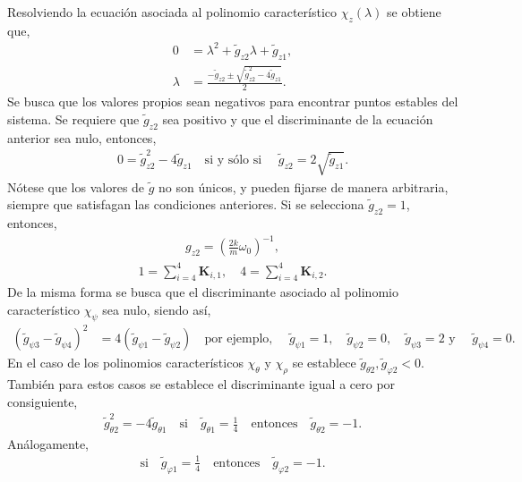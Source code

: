 Resolviendo la ecuación asociada al polinomio característico $\chi_{z}(\lambda)$ se obtiene que, 
\begin{align}
0 & = \lambda^2 + \tilde{g}_{z 2} \lambda + \tilde{g}_{z 1}, \\
\lambda &= \frac{- \tilde{g}_{z 2} \pm \sqrt{\tilde{g}_{z 2}^2 - 4\tilde{g}_{z 1} }}{2}.
\end{align}
Se busca que los valores propios sean negativos para encontrar puntos estables del sistema. Se requiere que $\tilde{g}_{z2}$ sea positivo y que el discriminante de la ecuación anterior sea nulo, entonces,  \begin{align}
    0 = \tilde{g}_{z 2}^2 - 4\tilde{g}_{z 1} \quad\text{si y sólo si }\quad \tilde{g}_{z 2} = 2\sqrt{\tilde{g}_{z1}}.
\end{align}
Nótese que los valores de $\tilde{g}$ no son únicos, y pueden fijarse de manera arbitraria, siempre que satisfagan las condiciones anteriores. Si se selecciona $\tilde{g}_{z2} = 1$, entonces, 
\begin{align}
    g_{z2} = \left( \frac{2k}{m}\omega_0\right)^{-1},
\end{align}
\begin{align}
    1 = \sum_{i=4}^{4}\mathbf{K}_{i, 1}, \quad 4= \sum_{i=4}^{4}\mathbf{K}_{i, 2}.
\end{align}
De la misma forma se busca que el discriminante asociado al polinomio característico  $\chi_{\psi}$ sea nulo, siendo así, 
\begin{align}
    (\tilde{g}_{\psi 3} - \tilde{g}_{\psi4})^2 &= 4(\tilde{g}_{\psi 1} - \tilde{g}_{\psi 2}) \quad\text{por ejemplo, }\quad \tilde{g}_{\psi 1} = 1, \quad\tilde{g}_{\psi 2} = 0, \quad\tilde{g}_{\psi 3}=2 \text{ y } \quad \tilde{g}_{\psi 4} = 0.
\end{align}
En el caso de los polinomios característicos $\chi_{\theta}$ y $\chi_{\rho}$ se establece $\tilde{g}_{\theta 2}, \tilde{g}_{\varphi 2} < 0$. También para estos casos se establece el discriminante igual a cero por consiguiente,
\begin{align}
    \tilde{g}_{\theta 2}^2 = -4\tilde{g}_{\theta 1}\quad\text{si}\quad \tilde{g}_{\theta 1}= \frac{1}{4}\quad\text{entonces}\quad\tilde{g}_{\theta 2} = -1.
\end{align}
Análogamente, 
\begin{align}
    \text{si}\quad \tilde{g}_{\varphi 1} = \frac{1}{4}\quad\text{entonces}\quad \tilde{g}_{\varphi 2} = -1.
\end{align}

